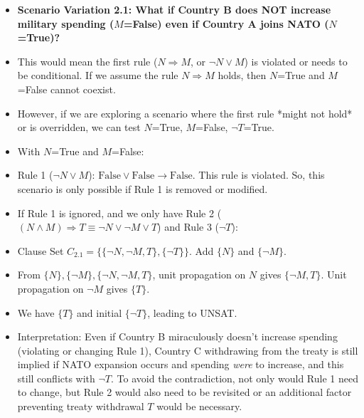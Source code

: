 \documentclass[11pt, a4paper]{article}
\begin{document}
\begin{itemize}
    \item \textbf{Scenario Variation 2.1: What if Country B does NOT increase military spending ($M$=False) even if Country A joins NATO ($N$=True)?}
        \item This would mean the first rule ($N \Rightarrow M$, or $\neg N \vee M$) is violated or needs to be conditional. If we assume the rule $N \Rightarrow M$ holds, then $N$=True and $M$=False cannot coexist.
        \item However, if we are exploring a scenario where the first rule *might not hold* or is overridden, we can test $N$=True, $M$=False, $\neg T$=True.
        \item With $N$=True and $M$=False:
            \item Rule 1 ($\neg N \vee M$): $\text{False} \vee \text{False} \rightarrow \text{False}$. This rule is violated. So, this scenario is only possible if Rule 1 is removed or modified.
            \item If Rule 1 is ignored, and we only have Rule 2 ($(N \wedge M) \Rightarrow T \equiv \neg N \vee \neg M \vee T$) and Rule 3 ($\neg T$):
                \item Clause Set $C_{2.1} = \{\{\neg N, \neg M, T\}, \{\neg T\}\}$. Add $\{N\}$ and $\{\neg M\}$.
                \item From $\{N\}, \{\neg M\}, \{\neg N, \neg M, T\}$, unit propagation on $N$ gives $\{\neg M, T\}$. Unit propagation on $\neg M$ gives $\{T\}$.
                \item We have $\{T\}$ and initial $\{\neg T\}$, leading to UNSAT.
        \item Interpretation: Even if Country B miraculously doesn't increase spending (violating or changing Rule 1), Country C withdrawing from the treaty is still implied if NATO expansion occurs and spending \textit{were} to increase, and this still conflicts with $\neg T$. To avoid the contradiction, not only would Rule 1 need to change, but Rule 2 would also need to be revisited or an additional factor preventing treaty withdrawal $T$ would be necessary.


\end{itemize}
\end{document}
